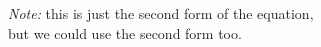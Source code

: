 \documentclass[preview]{standalone}
\begin{document}
\begin{center}
\raggedright
                \textit{Note: } this is just the second form of the equation, \\
                but we could use the second form too.
\end{center}
\end{document}
